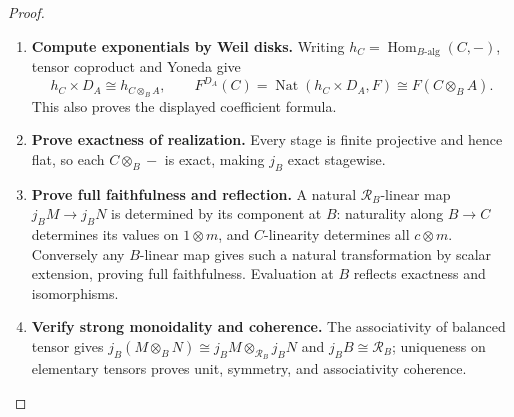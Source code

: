 \documentclass[11pt,a4paper]{article}
\numberwithin{algorithm}{section}
\numberwithin{equation}{section}
\theoremstyle{definition}
\theoremstyle{remark}
\theoremstyle{plain}
\newcommand{\Hom}{\operatorname{Hom}}
\newcommand{\Rline}{\mathcal R_B}
\theoremstyle{definition}
\theoremstyle{plain}
\begin{document}
\begin{proof}\leavevmode
\begin{enumerate}[leftmargin=*,align=left]
\item \textbf{Compute exponentials by Weil disks.}
Writing $h_C=\Hom_{B\text{-alg}}(C,-)$, tensor coproduct and
Yoneda give
\[
 h_C\times D_A\cong h_{C\otimes_BA},\qquad
 F^{D_A}(C)=\operatorname{Nat}(h_C\times D_A,F)
 \cong F(C\otimes_BA).
\]
This also proves the displayed coefficient formula.

\item \textbf{Prove exactness of realization.}
Every stage is finite projective and hence flat, so each
$C\otimes_B-$ is exact, making $j_B$ exact stagewise.

\item \textbf{Prove full faithfulness and reflection.}
A natural $\Rline$-linear map $j_BM\to j_BN$ is determined by
its component at $B$: naturality along $B\to C$ determines
its values on $1\otimes m$, and $C$-linearity determines
all $c\otimes m$.  Conversely any $B$-linear map gives such
a natural transformation by scalar extension, proving full
faithfulness.  Evaluation at $B$ reflects exactness and
isomorphisms.

\item \textbf{Verify strong monoidality and coherence.}
The associativity of balanced tensor gives
$j_B(M\otimes_BN)\cong j_BM\otimes_{\Rline}j_BN$ and
$j_BB\cong\Rline$; uniqueness on elementary tensors proves
unit, symmetry, and associativity coherence.
\end{enumerate}
\end{proof}
\end{document}

